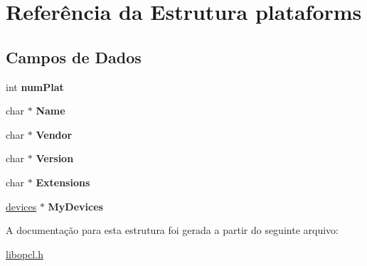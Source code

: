 \hypertarget{structplataforms}{}\section{Referência da Estrutura plataforms}
\label{structplataforms}
\subsection*{Campos de Dados}
\begin{DoxyCompactItemize}
\item 
\hypertarget{structplataforms_a8cc0a7307d1088b3be86bad8514a85a3}{}\label{structplataforms_a8cc0a7307d1088b3be86bad8514a85a3} 
int {\bfseries num\+Plat}
\item 
\hypertarget{structplataforms_a5e6182c030324511dd82e9fa1a0ab071}{}\label{structplataforms_a5e6182c030324511dd82e9fa1a0ab071} 
char $\ast$ {\bfseries Name}
\item 
\hypertarget{structplataforms_a3edc9ba9f59b30aa97a8d6d258caa80f}{}\label{structplataforms_a3edc9ba9f59b30aa97a8d6d258caa80f} 
char $\ast$ {\bfseries Vendor}
\item 
\hypertarget{structplataforms_abc057f42fdaf5e63835a8272aefe278e}{}\label{structplataforms_abc057f42fdaf5e63835a8272aefe278e} 
char $\ast$ {\bfseries Version}
\item 
\hypertarget{structplataforms_a04797e250a09482a400749add9f8862e}{}\label{structplataforms_a04797e250a09482a400749add9f8862e} 
char $\ast$ {\bfseries Extensions}
\item 
\hypertarget{structplataforms_adcd439f5e569e26a6614e6ab344d72d2}{}\label{structplataforms_adcd439f5e569e26a6614e6ab344d72d2} 
\hyperlink{structdevices}{devices} $\ast$ {\bfseries My\+Devices}
\end{DoxyCompactItemize}


A documentação para esta estrutura foi gerada a partir do seguinte arquivo\+:\begin{DoxyCompactItemize}
\item 
\hyperlink{libopcl_8h}{libopcl.\+h}\end{DoxyCompactItemize}

